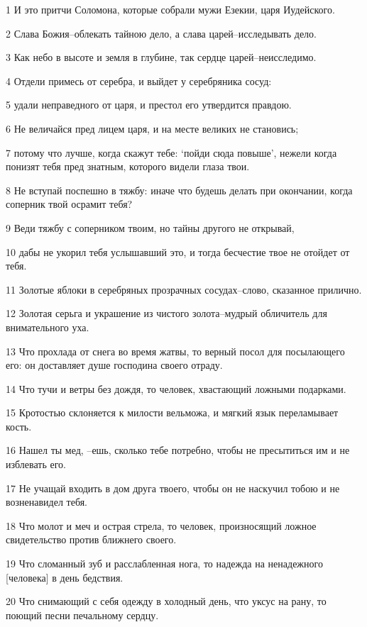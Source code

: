\par 1 И это притчи Соломона, которые собрали мужи Езекии, царя Иудейского.
\par 2 Слава Божия--облекать тайною дело, а слава царей--исследывать дело.
\par 3 Как небо в высоте и земля в глубине, так сердце царей--неисследимо.
\par 4 Отдели примесь от серебра, и выйдет у серебряника сосуд:
\par 5 удали неправедного от царя, и престол его утвердится правдою.
\par 6 Не величайся пред лицем царя, и на месте великих не становись;
\par 7 потому что лучше, когда скажут тебе: `пойди сюда повыше', нежели когда понизят тебя пред знатным, которого видели глаза твои.
\par 8 Не вступай поспешно в тяжбу: иначе что будешь делать при окончании, когда соперник твой осрамит тебя?
\par 9 Веди тяжбу с соперником твоим, но тайны другого не открывай,
\par 10 дабы не укорил тебя услышавший это, и тогда бесчестие твое не отойдет от тебя.
\par 11 Золотые яблоки в серебряных прозрачных сосудах--слово, сказанное прилично.
\par 12 Золотая серьга и украшение из чистого золота--мудрый обличитель для внимательного уха.
\par 13 Что прохлада от снега во время жатвы, то верный посол для посылающего его: он доставляет душе господина своего отраду.
\par 14 Что тучи и ветры без дождя, то человек, хвастающий ложными подарками.
\par 15 Кротостью склоняется к милости вельможа, и мягкий язык переламывает кость.
\par 16 Нашел ты мед, --ешь, сколько тебе потребно, чтобы не пресытиться им и не изблевать его.
\par 17 Не учащай входить в дом друга твоего, чтобы он не наскучил тобою и не возненавидел тебя.
\par 18 Что молот и меч и острая стрела, то человек, произносящий ложное свидетельство против ближнего своего.
\par 19 Что сломанный зуб и расслабленная нога, то надежда на ненадежного [человека] в день бедствия.
\par 20 Что снимающий с себя одежду в холодный день, что уксус на рану, то поющий песни печальному сердцу.

